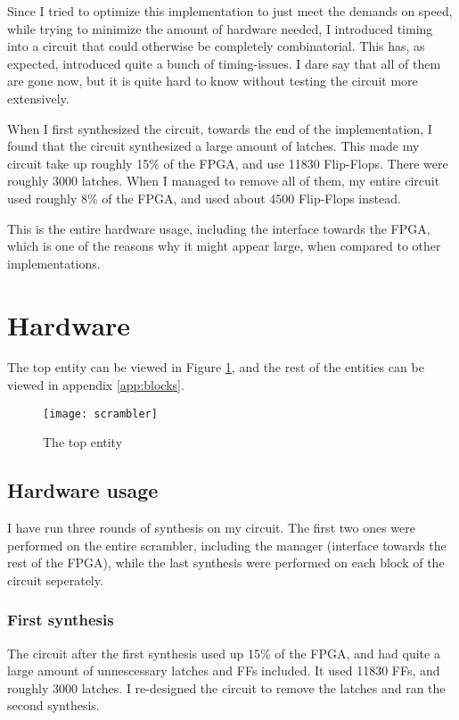 Since I tried to optimize this implementation to just meet the demands 
on speed, while trying to minimize the amount of hardware needed, I 
introduced timing into a circuit that could otherwise be completely 
combinatorial. This has, as expected, introduced quite a bunch of 
timing-issues. I dare say that all of them are gone now, but it is 
quite hard to know without testing the circuit more extensively.

When I first synthesized the circuit, towards the end of the 
implementation, I found that the circuit synthesized a large amount of 
latches. This made my circuit take up roughly 15\% of the FPGA, and use 
11830 Flip-Flops. There were roughly 3000 latches.
When I managed to remove all of them, my entire circuit used roughly 8\%
of the FPGA, and used about 4500 Flip-Flops instead.

This is the entire hardware usage, including the interface towards the 
FPGA, which is one of the reasons why it might appear large, when 
compared to other implementations.

\section{Hardware}
The top entity can be viewed in Figure \ref{b:scr}, and the rest of 
the entities can be viewed in appendix \ref{app:blocks}.

\begin{figure}
  \texttt{[image: scrambler]}
  \caption{The top entity}
  \label{b:scr}
\end{figure}

\subsection{Hardware usage}
I have run three rounds of synthesis on my circuit. The first two ones 
were performed on the entire scrambler, including the manager 
(interface towards the rest of the FPGA), while the last synthesis were 
performed on each block of the circuit seperately.

\subsubsection{First synthesis}
The circuit after the first synthesis used up 15\% of the FPGA, and had 
quite a large amount of unnescessary latches and FFs included. It used 
11830 FFs, and roughly 3000 latches. I re-designed the circuit to 
remove the latches and ran the second synthesis.

